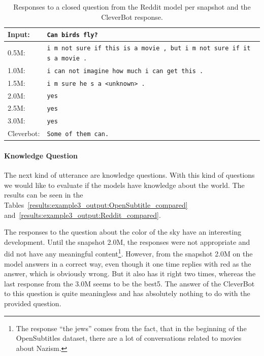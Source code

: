 \begin{table}[H]
	\centering
	\begin{adjustbox}{max width=\textwidth}
		\begin{tabular}{ll}
			\toprule
			Input: 	& \texttt{Can birds fly?}\\
			\midrule
			0.5M: 	& \texttt{i m not sure if this is a movie , but i m not sure if it s a movie .}\\
			1.0M: 	& \texttt{i can not imagine how much i can get this .}\\
			1.5M:	& \texttt{i m sure he s a <unknown> .}\\
			2.0M:	& \texttt{yes}\\
			2.5M:	& \texttt{yes}\\
			3.0M:	& \texttt{yes}\\
			Cleverbot:	& \texttt{Some of them can.}\\
			\bottomrule
		\end{tabular}
	\end{adjustbox}
	\caption{Responses to a closed question from the Reddit model per snapshot and the CleverBot response.}
	\label{results:example2_output:Reddit_compared}
\end{table}

\paragraph{Knowledge Question}
The next kind of utterance are knowledge questions. With this kind of questions we would like to evaluate if the models have knowledge about the world. The results can be seen in the Tables~\ref{results:example3_output:OpenSubtitle_compared} and~\ref{results:example3_output:Reddit_compared}.

The responses to the question about the color of the sky have an interesting development. Until the snapshot 2.0M, the responses were not appropriate and did not have any meaningful content\footnote{The response ``the jews'' comes from the fact, that in the beginning of the OpenSubtitles dataset, there are a lot of conversations related to movies about Nazism.}. However, from the snapshot 2.0M on the model answers in a correct way, even though it one time replies with red as the answer, which is obviously wrong. But it also has it right two times, whereas the last response from the 3.0M seems to be the best5. The answer of the CleverBot to this question is quite meaningless and has absolutely nothing to do with the provided question.

